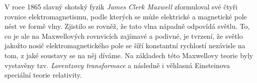 \documentclass{../../../../style/mkimain}
\begin{document}
\noindent{}
\proborigin{}
\klein

V roce 1865 slavný skotský fyzik \emph{James Clerk Maxwell} zformuloval své čtyři rovnice elektromagnetismu,
podle kterých se může elektrické a magnetické pole nést ve formě vlny. %
Zjistilo se rovněž, že tato vlna nápadně odpovídá světlu.
To, co je ale na Maxwellových rovnvicích zajímavé a podivné, je tvrzení,
že světlo jakožto nosič elektromagnetického pole se šíří konstantní rychlostí nezávisle na tom, z jaké soustavy se na něj díváme.
Na základech této Maxwellovy teorie byly vystavěny tzv. \emph{Lorentzovy transformace}
a následně i věhlasná Einsteinova speciální teorie relativity.

\end{document}
